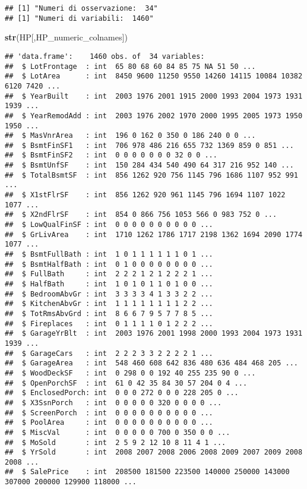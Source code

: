 \documentclass[
]{article}
\newenvironment{Shaded}{\begin{snugshade}}{\end{snugshade}}
\newcommand{\FunctionTok}[1]{\textcolor[rgb]{0.13,0.29,0.53}{\textbf{#1}}}
\newcommand{\NormalTok}[1]{#1}
\begin{document}
\begin{verbatim}
## [1] "Numeri di osservazione:  34"
## [1] "Numeri di variabili:  1460"
\end{verbatim}

\begin{Shaded}
\begin{Highlighting}[]
\FunctionTok{str}\NormalTok{(HP[,HP\_numeric\_colnames])}
\end{Highlighting}
\end{Shaded}

\begin{verbatim}
## 'data.frame':    1460 obs. of  34 variables:
##  $ LotFrontage  : int  65 80 68 60 84 85 75 NA 51 50 ...
##  $ LotArea      : int  8450 9600 11250 9550 14260 14115 10084 10382 6120 7420 ...
##  $ YearBuilt    : int  2003 1976 2001 1915 2000 1993 2004 1973 1931 1939 ...
##  $ YearRemodAdd : int  2003 1976 2002 1970 2000 1995 2005 1973 1950 1950 ...
##  $ MasVnrArea   : int  196 0 162 0 350 0 186 240 0 0 ...
##  $ BsmtFinSF1   : int  706 978 486 216 655 732 1369 859 0 851 ...
##  $ BsmtFinSF2   : int  0 0 0 0 0 0 0 32 0 0 ...
##  $ BsmtUnfSF    : int  150 284 434 540 490 64 317 216 952 140 ...
##  $ TotalBsmtSF  : int  856 1262 920 756 1145 796 1686 1107 952 991 ...
##  $ X1stFlrSF    : int  856 1262 920 961 1145 796 1694 1107 1022 1077 ...
##  $ X2ndFlrSF    : int  854 0 866 756 1053 566 0 983 752 0 ...
##  $ LowQualFinSF : int  0 0 0 0 0 0 0 0 0 0 ...
##  $ GrLivArea    : int  1710 1262 1786 1717 2198 1362 1694 2090 1774 1077 ...
##  $ BsmtFullBath : int  1 0 1 1 1 1 1 1 0 1 ...
##  $ BsmtHalfBath : int  0 1 0 0 0 0 0 0 0 0 ...
##  $ FullBath     : int  2 2 2 1 2 1 2 2 2 1 ...
##  $ HalfBath     : int  1 0 1 0 1 1 0 1 0 0 ...
##  $ BedroomAbvGr : int  3 3 3 3 4 1 3 3 2 2 ...
##  $ KitchenAbvGr : int  1 1 1 1 1 1 1 1 2 2 ...
##  $ TotRmsAbvGrd : int  8 6 6 7 9 5 7 7 8 5 ...
##  $ Fireplaces   : int  0 1 1 1 1 0 1 2 2 2 ...
##  $ GarageYrBlt  : int  2003 1976 2001 1998 2000 1993 2004 1973 1931 1939 ...
##  $ GarageCars   : int  2 2 2 3 3 2 2 2 2 1 ...
##  $ GarageArea   : int  548 460 608 642 836 480 636 484 468 205 ...
##  $ WoodDeckSF   : int  0 298 0 0 192 40 255 235 90 0 ...
##  $ OpenPorchSF  : int  61 0 42 35 84 30 57 204 0 4 ...
##  $ EnclosedPorch: int  0 0 0 272 0 0 0 228 205 0 ...
##  $ X3SsnPorch   : int  0 0 0 0 0 320 0 0 0 0 ...
##  $ ScreenPorch  : int  0 0 0 0 0 0 0 0 0 0 ...
##  $ PoolArea     : int  0 0 0 0 0 0 0 0 0 0 ...
##  $ MiscVal      : int  0 0 0 0 0 700 0 350 0 0 ...
##  $ MoSold       : int  2 5 9 2 12 10 8 11 4 1 ...
##  $ YrSold       : int  2008 2007 2008 2006 2008 2009 2007 2009 2008 2008 ...
##  $ SalePrice    : int  208500 181500 223500 140000 250000 143000 307000 200000 129900 118000 ...
\end{verbatim}
\end{document}
